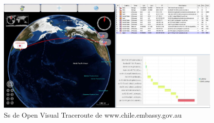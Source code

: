 \documentclass[a4paper]{article}
\begin{document}
\begin{figure}
\centering
\includegraphics[width=1\textwidth]{chileembassy2.JPG}
\caption{\label{fig:embassy2}Ss de Open Visual Traceroute de www.chile.embassy.gov.au}
\end{figure}
\end{document}

